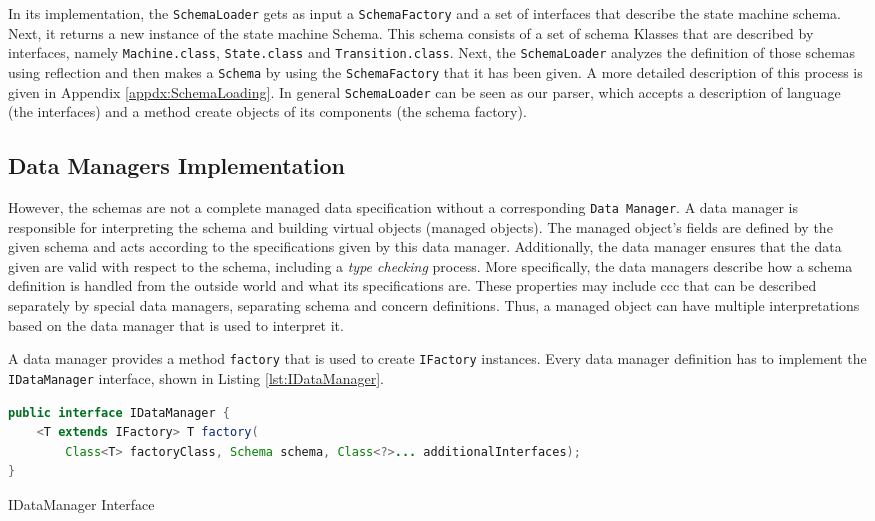 In its implementation, the \texttt{SchemaLoader} gets as input a \texttt{SchemaFactory} and a set of interfaces that describe the state machine schema.
Next, it returns a new instance of the state machine Schema.
This schema consists of a set of schema Klasses that are described by interfaces, namely \texttt{Machine.class}, \texttt{State.class} and \texttt{Transition.class}.
Next, the \texttt{SchemaLoader} analyzes the definition of those schemas using reflection and then makes a \texttt{Schema} by using the \texttt{SchemaFactory} that it has been given.
A more detailed description of this process is given in Appendix \ref{appdx:SchemaLoading}.
In general \texttt{SchemaLoader} can be seen as our parser, which accepts a description of language (the interfaces) and a method create objects of its components (the schema factory).

\subsection{Data Managers Implementation}\label{Data Managers Implementation}
However, the schemas are not a complete managed data specification without a corresponding \texttt{Data Manager}.
A data manager is responsible for interpreting the schema and building virtual objects (managed objects). 
The managed object's fields are defined by the given schema and acts according to the specifications given by this data manager.
Additionally, the data manager ensures that the data given are valid with respect to the schema, including a \textit{type checking} process.
More specifically, the data managers describe how a schema definition is handled from the outside world and what its specifications are.
These properties may include \ac{ccc} that can be described separately by special data managers, separating schema and concern definitions.
Thus, a managed object can have multiple interpretations based on the data manager that is used to interpret it.

A data manager provides a method \texttt{factory} that is used to create \texttt{IFactory} instances.
Every data manager definition has to implement the \texttt{IDataManager} interface, shown in Listing \ref{lst:IDataManager}.

\begin{sourcecode} [H]
	\begin{lstlisting}[language=Java, escapechar=|]
public interface IDataManager {
	<T extends IFactory> T factory(
		Class<T> factoryClass, Schema schema, Class<?>... additionalInterfaces);
}
	\end{lstlisting}
	\caption{IDataManager Interface}
	\label{lst:IDataManager}
\end{sourcecode}

